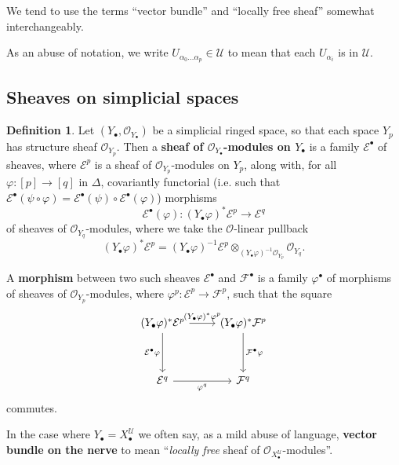 \documentclass[11pt,fleqn]{article}
\theoremstyle{plain}
\theoremstyle{definition}
\newtheorem{definition}[theorem]{Definition}
\theoremstyle{remark}
\numberwithin{equation}{theorem}
\newcommand{\cover}{\mathcal{U}}
\newcommand{\OO}{\mathcal{O}}
\newcommand{\define}[1]{\textbf{#1}}
\newcommand{\nerve}[1]{X_{#1}^\cover}
\begin{document}
        \medskip

        We tend to use the terms ``vector bundle'' and ``locally free sheaf'' somewhat interchangeably.

        \medskip

        As an abuse of notation, we write $U_{\alpha_0\ldots\alpha_p}\in\cover$ to mean that each $U_{\alpha_i}$ is in $\cover$.


    \subsection{Sheaves on simplicial spaces}

        \begin{definition}\label{definition:sheaf-on-a-simplicial-space}
            Let $(Y_\bullet,\OO_{Y_\bullet})$ be a simplicial ringed space, so that each space $Y_p$ has structure sheaf $\OO_{Y_p}$.
            Then a \define{sheaf of $\OO_{Y_\bullet}$-modules on $Y_\bullet$} is a family $\mathcal{E}^\bullet$ of sheaves, where $\mathcal{E}^p$ is a sheaf of $\OO_{Y_p}$-modules on $Y_p$, along with, for all $\varphi\colon[p]\to[q]$ in $\Delta$, covariantly functorial (i.e. such that $\mathcal{E}^\bullet(\psi\circ\varphi) = \mathcal{E}^\bullet(\psi)\circ \mathcal{E}^\bullet(\varphi)$) morphisms
            \[
                \mathcal{E}^\bullet(\varphi) \colon (Y_\bullet\varphi)^*\mathcal{E}^p \to \mathcal{E}^q
            \]
            of sheaves of $\OO_{Y_q}$-modules, where we take the $\OO$-linear pullback
            \[
                (Y_\bullet\varphi)^*\mathcal{E}^p
                =
                (Y_\bullet\varphi)^{-1}\mathcal{E}^p
                \otimes_{(Y_\bullet\varphi)^{-1}\OO_{Y_p}}
                \OO_{Y_q}.
            \]

            A \define{morphism} between two such sheaves $\mathcal{E}^\bullet$ and $\mathcal{F}^\bullet$ is a family $\varphi^\bullet$ of morphisms of sheaves of $\OO_{Y_p}$-modules, where $\varphi^p\colon \mathcal{E}^p\to \mathcal{F}^p$, such that the square
            \[
                \begin{tikzcd}[row sep=huge]
                    (Y_\bullet\varphi)^*\mathcal{E}^p
                        \ar[r,"(Y_\bullet\varphi)^*\varphi^p"]
                        \ar[d,swap,"\mathcal{E}^\bullet\varphi"]
                &   (Y_\bullet\varphi)^*\mathcal{F}^p
                        \ar[d,"\mathcal{F}^\bullet\varphi"]
                \\  \mathcal{E}^q
                        \ar[r,swap,"\varphi^q"]
                &   \mathcal{F}^q
                \end{tikzcd}
            \]
            commutes.

            In the case where $Y_\bullet=\nerve{\bullet}$ we often say, as a mild abuse of language, \define{vector bundle on the nerve} to mean ``\emph{locally free} sheaf of $\OO_{\nerve{\bullet}}$-modules''.
        \end{definition}
\end{document}
